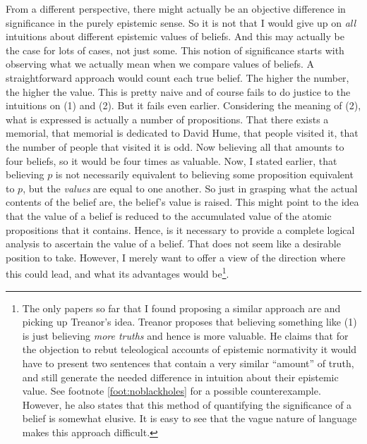 \documentclass[12pt,numbers=noenddot]{scrartcl}
\begin{document}
From a different perspective, there might actually be an objective difference in significance in the purely epistemic sense. So it is not that I would give up on \emph{all} intuitions about different epistemic values of beliefs. And this may actually be the case for lots of cases, not just some. This notion of significance starts with observing what we actually mean when we compare values of beliefs. A straightforward approach would count each true belief. The higher the number, the higher the value. This is pretty naive and of course fails to do justice to the intuitions on (1) and (2). But it fails even earlier. Considering the meaning of (2), what is expressed is actually a number of propositions. That there exists a memorial, that memorial is dedicated to David Hume, that people visited it, that the number of people that visited it is odd. Now believing all that amounts to four beliefs, so it would be four times as valuable. Now, I stated earlier, that believing $p$ is not necessarily equivalent to believing some proposition equivalent to $p$, but the \emph{values} are equal to one another. So just in grasping what the actual contents of the belief are, the belief's value is raised. This might point to the idea that the value of a belief is reduced to the accumulated value of the atomic propositions that it contains. Hence, is it necessary to provide a complete logical analysis to ascertain the value of a belief. That does not seem like a desirable position to take. However, I merely want to offer a view of the direction where this could lead, and what its advantages would be\footnote{The only papers so far that I found proposing a similar approach are \textcite{Treanor2014-TRETTA} and \textcite{Pritchard2014} picking up Treanor's idea. Treanor proposes that believing something like (1) is just believing \emph{more truths} and hence is more valuable. He claims that for the objection to rebut teleological accounts of epistemic normativity it would have to present two sentences that contain a very similar “amount” of truth, and still generate the needed difference in intuition about their epistemic value. See footnote \ref{foot:noblackholes} for a possible counterexample. However, he also states that this method of quantifying the significance of a belief is somewhat elusive. It is easy to see that the vague nature of language makes this approach difficult.}.
\end{document}

